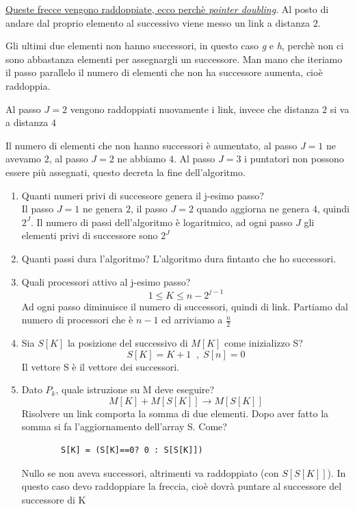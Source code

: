 \uline{Queste frecce vengono raddoppiate, ecco perchè \textit{pointer doubling}}. Al posto di andare dal proprio elemento al successivo viene messo un link a distanza $2$.

Gli ultimi due elementi non hanno successori, in questo caso \textit{g} e \textit{h}, perchè non ci sono abbastanza elementi per assegnargli un successore. Man mano che iteriamo il passo parallelo il numero di elementi che non ha successore aumenta, cioè raddoppia.

Al passo $J=2$ vengono raddoppiati nuovamente i link, invece che distanza $2$ si va a distanza $4$

Il numero di elementi che non hanno successori è aumentato, al passo $J=1$ ne avevamo $2$, al passo $J=2$ ne abbiamo $4$. Al passo $J=3$ i puntatori non possono essere più assegnati, questo decreta la fine dell'algoritmo.

\begin{enumerate}
    \item Quanti numeri privi di successore genera il j-esimo passo?\\
    Il passo $J=1$ ne genera $2$, il passo $J=2$ quando aggiorna ne genera $4$, quindi $2^J$. Il numero di passi dell'algoritmo è logaritmico, ad ogni passo $J$ gli elementi privi di successore sono $2^J$
    \item Quanti passi dura l'algoritmo? L'algoritmo dura fintanto che ho successori.
    \item Quali processori attivo al j-esimo passo?
    $$1 \leq K \leq n-2^{j-1}$$
    Ad ogni passo diminuisce il numero di successori, quindi di link. Partiamo dal numero di processori che è $n-1$ ed arriviamo a $\frac{n}{2}$
    \item Sia $S[K]$ la posizione del successivo di $M[K]$ come inizializzo S?
    $$S[K]=K+1\;\;,\; S[n]=0$$
    Il vettore S è il vettore dei successori.
    \item Dato $P_k$, quale istruzione su M deve eseguire? $$M[K]+M[S[K]] \rightarrow M[S[K]]$$
    Risolvere un link comporta la somma di due elementi. Dopo aver fatto la somma si fa l'aggiornamento dell'array S. Come?
    \begin{lstlisting}
        S[K] = (S[K]==0? 0 : S[S[K]])
    \end{lstlisting}
    Nullo se non aveva successori, altrimenti va raddoppiato (con $S[S[K]]$). In questo caso devo raddoppiare la freccia, cioè dovrà puntare al successore del successore di K
\end{enumerate}

